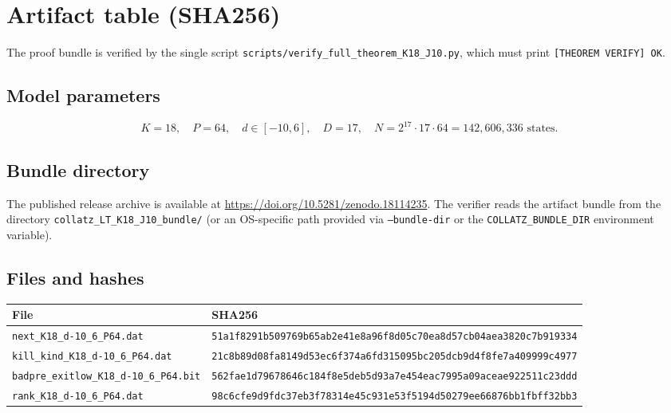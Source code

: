 ﻿%

\section{Artifact table (SHA256)}
\label{app:artifacts}

The proof bundle is verified by the single script
\texttt{scripts/verify\_full\_theorem\_K18\_J10.py}, which must print
\texttt{[THEOREM VERIFY] OK}.

\subsection*{Model parameters}
\[
K=18,\quad P=64,\quad d\in[-10,6],\quad D=17,\quad
N = 2^{17}\cdot 17\cdot 64 = 142{,}606{,}336 \text{ states}.
\]

\subsection*{Bundle directory}

The published release archive is available at \url{https://doi.org/10.5281/zenodo.18114235}.
The verifier reads the artifact bundle from the directory
\texttt{collatz\_LT\_K18\_J10\_bundle/} (or an OS-specific path provided via
\texttt{--bundle-dir} or the \texttt{COLLATZ\_BUNDLE\_DIR} environment variable).

\subsection*{Files and hashes}

\begin{center}
\begin{tabular}{ll}
\toprule
File & SHA256 \\
\midrule
\texttt{next\_K18\_d-10\_6\_P64.dat} &
\texttt{51a1f8291b509769b65ab2e41e8a96f8d05c70ea8d57cb04aea3820c7b919334} \\

\texttt{kill\_kind\_K18\_d-10\_6\_P64.dat} &
\texttt{21c8b89d08fa8149d53ec6f374a6fd315095bc205dcb9d4f8fe7a409999c4977} \\

\texttt{badpre\_exitlow\_K18\_d-10\_6\_P64.bit} &
\texttt{562fae1d79678646c184f8e5deb5d93a7e454eac7995a09aceae922511c23ddd} \\

\texttt{rank\_K18\_d-10\_6\_P64.dat} &
\texttt{98c6cfe9d9fdc37eb3f78314e45c931e53f5194d50279ee66876bb1fbff32bb3} \\
\bottomrule
\end{tabular}
\end{center}


